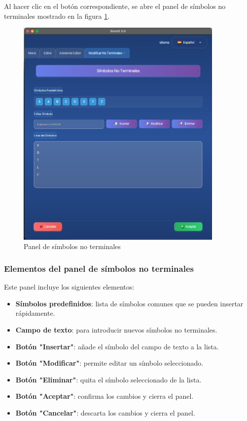 Al hacer clic en el botón correspondiente, se abre el panel de símbolos no terminales mostrado en la figura \ref{fig:panel_no_terminales}.

\needspace{8cm}
\begin{figure}[H]
    \centering
    \includegraphics[width=0.9\textwidth]{figuras/editor/panel_no_terminales.png}
    \caption{Panel de símbolos no terminales}
    \label{fig:panel_no_terminales}
\end{figure}

\subsubsection{Elementos del panel de símbolos no terminales}

Este panel incluye los siguientes elementos:

\begin{itemize}
    \item \textbf{Símbolos predefinidos}: lista de símbolos comunes que se pueden insertar rápidamente.
    \item \textbf{Campo de texto}: para introducir nuevos símbolos no terminales.
    \item \textbf{Botón \string"Insertar\string"}: añade el símbolo del campo de texto a la lista.
    \item \textbf{Botón \string"Modificar\string"}: permite editar un símbolo seleccionado.
    \item \textbf{Botón \string"Eliminar\string"}: quita el símbolo seleccionado de la lista.
    \item \textbf{Botón \string"Aceptar\string"}: confirma los cambios y cierra el panel.
    \item \textbf{Botón \string"Cancelar\string"}: descarta los cambios y cierra el panel.
\end{itemize}

